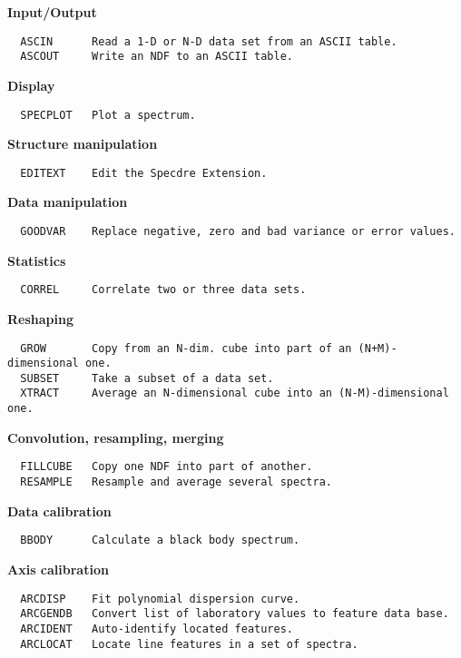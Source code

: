 
{\bf Input/Output}
\begin{verbatim}
  ASCIN      Read a 1-D or N-D data set from an ASCII table.
  ASCOUT     Write an NDF to an ASCII table.
\end{verbatim}

{\bf Display}
\begin{verbatim}
  SPECPLOT   Plot a spectrum.
\end{verbatim}

{\bf Structure manipulation}
\begin{verbatim}
  EDITEXT    Edit the Specdre Extension.
\end{verbatim}

{\bf Data manipulation}
\begin{verbatim}
  GOODVAR    Replace negative, zero and bad variance or error values.
\end{verbatim}


{\bf Statistics}
\begin{verbatim}
  CORREL     Correlate two or three data sets.
\end{verbatim}

{\bf Reshaping}
\begin{verbatim}
  GROW       Copy from an N-dim. cube into part of an (N+M)-dimensional one.
  SUBSET     Take a subset of a data set.
  XTRACT     Average an N-dimensional cube into an (N-M)-dimensional one.
\end{verbatim}

{\bf Convolution, resampling, merging}
\begin{verbatim}
  FILLCUBE   Copy one NDF into part of another.
  RESAMPLE   Resample and average several spectra.
\end{verbatim}

{\bf Data calibration}   %
\begin{verbatim}
  BBODY      Calculate a black body spectrum.
\end{verbatim}

{\bf Axis calibration}
\begin{verbatim}
  ARCDISP    Fit polynomial dispersion curve.
  ARCGENDB   Convert list of laboratory values to feature data base.
  ARCIDENT   Auto-identify located features.
  ARCLOCAT   Locate line features in a set of spectra.
\end{verbatim}

